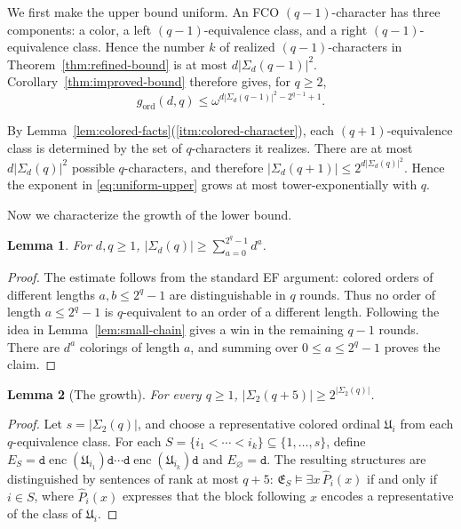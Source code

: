 \documentclass{amsart}
\newtheorem{lemma}{Lemma}
\theoremstyle{definition}
\begin{document}
We first make the upper bound uniform. An FCO $(q-1)$-character has three components: a color, a left $(q-1)$-equivalence class, and a right $(q-1)$-equivalence class. Hence the number $k$ of realized $(q-1)$-characters in Theorem~\ref{thm:refined-bound} is at most $d|\Sigma_d(q-1)|^2$. Corollary~\ref{thm:improved-bound} therefore gives, for $q\geq2$,
\begin{equation}
    g_{\mathrm{ord}}(d,q)\leq\omega^{d|\Sigma_d(q-1)|^2-2^{q-1}+1}.
    \label{eq:uniform-upper}
\end{equation}

By Lemma~\ref{lem:colored-facts}(\ref{itm:colored-character}), each $(q+1)$-equivalence class is determined by the set of $q$-characters it realizes. There are at most $d|\Sigma_d(q)|^2$ possible $q$-characters, and therefore $|\Sigma_d(q+1)|\leq2^{d|\Sigma_d(q)|^2}$. Hence the exponent in \eqref{eq:uniform-upper} grows at most tower-exponentially with $q$.

Now we characterize the growth of the lower bound.

\begin{lemma}\label{lem:finite-word-count}
    For $d,q\geq1$, $|\Sigma_d (q)|\geq\sum_{a=0}^{2^q-1}d^a$.
\end{lemma}
\begin{proof}
    The estimate follows from the standard EF argument: colored orders of different lengths $a,b\leq2^q-1$ are distinguishable in $q$ rounds. Thus no order of length $a\leq2^q-1$ is $q$-equivalent to an order of a different length. Following the idea in Lemma~\ref{lem:small-chain} gives a win in the remaining $q-1$ rounds. There are $d^a$ colorings of length $a$, and summing over $0\leq a\leq 2^q-1$ proves the claim.
\end{proof}

\begin{lemma}[The growth]\label{lem:binary-powerset}
    For every $q\geq1$, $|\Sigma_2 (q+5)|\geq2^{|\Sigma_2 (q)|}$.
\end{lemma}
\begin{proof}
Let $s=|\Sigma_2(q)|$, and choose a representative colored ordinal $\mathfrak U_i$ from each $q$-equivalence class. For each $S=\{i_1<\cdots<i_k\}\subseteq\{1,\dots,s\}$, define
$E_S=\mathtt d\operatorname{enc}(\mathfrak U_{i_1})\mathtt d\cdots\mathtt d\operatorname{enc}(\mathfrak U_{i_k})\mathtt d$
and $E_\varnothing=\mathtt d$. The resulting structures are distinguished by sentences of rank at most $q+5$: $\mathfrak E_S\models\exists x\,\widehat P_i(x)$ if and only if $i\in S$, where $\widehat P_i(x)$ expresses that the block following $x$ encodes a representative of the class of $\mathfrak U_i$.
\end{proof}
\end{document}
